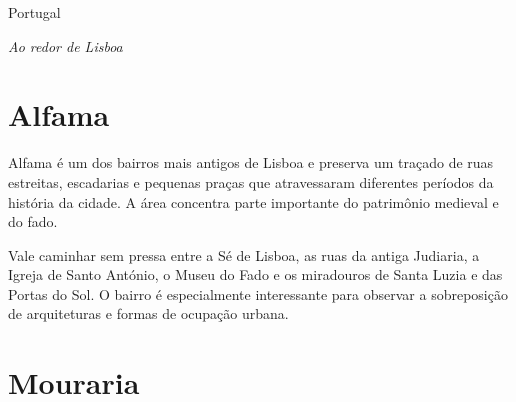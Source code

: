 
\blankpage
\pagebreak
\thispagestyle{empty}
\mbox{}
\begin{center}

\vspace{3cm}

{\brabo\HUGE Portugal}
\end{center}
\pagebreak


\blankpage
\pagebreak
\thispagestyle{empty}
\mbox{}
\begin{center}

\vspace{3cm}



{\brabo\HUGE\itshape Ao redor de Lisboa}
\end{center}
\pagebreak



\chapter{Alfama}

Alfama é um dos bairros mais antigos de Lisboa e preserva um traçado de ruas estreitas, escadarias e pequenas praças que atravessaram diferentes períodos da história da cidade. A área concentra parte importante do patrimônio medieval e do fado.

Vale caminhar sem pressa entre a Sé de Lisboa, as ruas da antiga Judiaria, a Igreja de Santo António, o Museu do Fado e os miradouros de Santa Luzia e das Portas do Sol. O bairro é especialmente interessante para observar a sobreposição de arquiteturas e formas de ocupação urbana.

\chapter{Mouraria}

